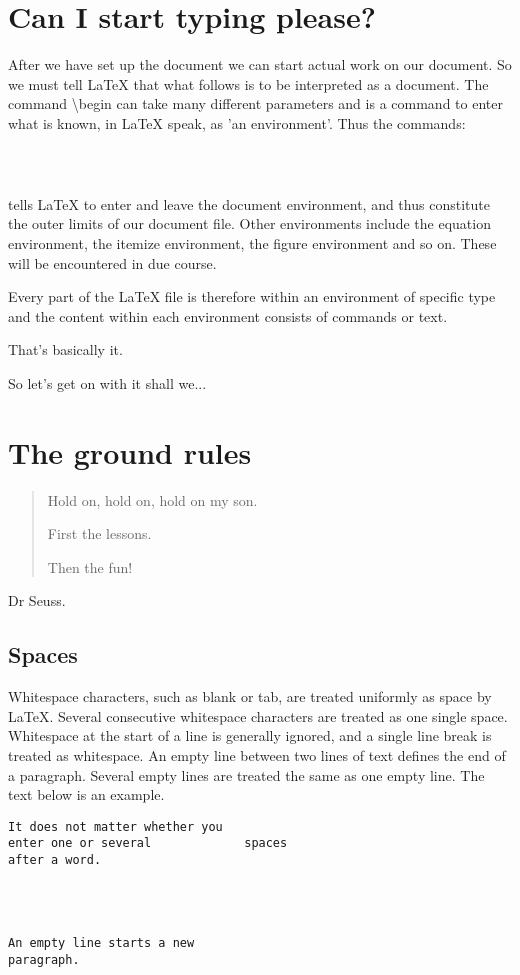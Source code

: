\pagebreak
\section{Can I start typing please?}

After we have set up the document we can start actual work on our document. So we must tell LaTeX that what follows is to be interpreted as a document.  The command {\textbackslash}begin can take many different parameters and is a command to enter what is known, in LaTeX speak, as 'an environment'. Thus the commands:
\begin{verbatim}



\end{verbatim}

tells LaTeX to enter and leave the document environment, and thus constitute the outer limits of our document file. Other environments include the equation environment, the itemize environment, the figure environment and so on. These will be encountered in due course.

Every part of the LaTeX file is therefore within an environment of specific type and the content within each environment consists of commands or text.

That's basically it.

So let's get on with it shall we...

\pagebreak
\section{The ground rules}
\begin{quote}
Hold on, hold on, hold on my son.

First the lessons.

Then the fun!
\end{quote}
Dr Seuss.

\subsection{Spaces}
Whitespace characters, such as blank or tab, are treated uniformly as space by LaTeX. Several consecutive whitespace characters are treated as one single space. Whitespace at the start of a line is generally ignored, and a single line break is treated as whitespace. An empty line between two lines of text defines the end of a paragraph. Several empty lines are treated the same as one empty line. The text below is an example.

\begin{verbatim}
It does not matter whether you
enter one or several             spaces
after a word.




An empty line starts a new
paragraph.
\end{verbatim}

